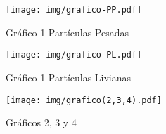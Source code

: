 \documentclass[../portafolio.tex]{subfiles}
\begin{document}
\begin{figure}[ht]
    \centering
    \texttt{[image: img/grafico-PP.pdf]}
    \caption{Gráfico 1 Partículas Pesadas }
    \label{fig:GPP1}
\end{figure}

\begin{figure}[ht]
    \centering
    \texttt{[image: img/grafico-PL.pdf]}
    \caption{Gráfico 1 Partículas Livianas }
    \label{fig:GPL1}
\end{figure}

\begin{figure}[ht]
    \centering
    \texttt{[image: img/grafico(2,3,4).pdf]}
    \caption{Gráficos 2, 3 y 4 }
    \label{fig:GPL1}
\end{figure}
\end{document}
